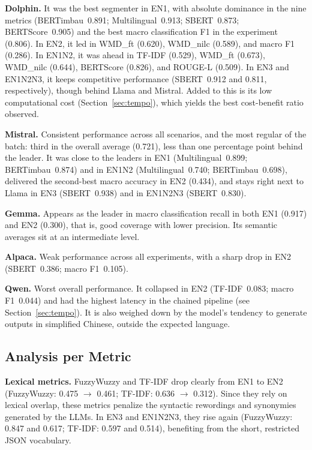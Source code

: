 \documentclass[a4paper,fleqn]{cas-sc}
\begin{document}
\textbf{Dolphin.} It was the best segmenter in EN1, with absolute dominance in the nine metrics (BERTimbau~0.891; Multilingual~0.913; SBERT~0.873; BERTScore~0.905) and the best macro classification F1 in the experiment (0.806). In EN2, it led in WMD\_ft (0.620), WMD\_nilc (0.589), and macro F1 (0.286). In EN1N2, it was ahead in TF-IDF (0.529), WMD\_ft (0.673), WMD\_nilc (0.644), BERTScore (0.826), and ROUGE-L (0.509). In EN3 and EN1N2N3, it keeps competitive performance (SBERT~0.912 and 0.811, respectively), though behind Llama and Mistral. Added to this is its low computational cost (Section~\ref{sec:tempo}), which yields the best cost-benefit ratio observed.

\textbf{Mistral.} Consistent performance across all scenarios, and the most regular of the batch: third in the overall average (0.721), less than one percentage point behind the leader. It was close to the leaders in EN1 (Multilingual~0.899; BERTimbau~0.874) and in EN1N2 (Multilingual~0.740; BERTimbau~0.698), delivered the second-best macro accuracy in EN2 (0.434), and stays right next to Llama in EN3 (SBERT~0.938) and in EN1N2N3 (SBERT~0.830).

\textbf{Gemma.} Appears as the leader in macro classification recall in both EN1 (0.917) and EN2 (0.300), that is, good coverage with lower precision. Its semantic averages sit at an intermediate level.

\textbf{Alpaca.} Weak performance across all experiments, with a sharp drop in EN2 (SBERT~0.386; macro F1~0.105).

\textbf{Qwen.} Worst overall performance. It collapsed in EN2 (TF-IDF~0.083; macro F1~0.044) and had the highest latency in the chained pipeline (see Section~\ref{sec:tempo}). It is also weighed down by the model's tendency to generate outputs in simplified Chinese, outside the expected language.

\subsection{Analysis per Metric}

\textbf{Lexical metrics.} FuzzyWuzzy and TF-IDF drop clearly from EN1 to EN2 (FuzzyWuzzy: 0.475 $\rightarrow$ 0.461; TF-IDF: 0.636 $\rightarrow$ 0.312). Since they rely on lexical overlap, these metrics penalize the syntactic rewordings and synonymies generated by the LLMs. In EN3 and EN1N2N3, they rise again (FuzzyWuzzy: 0.847 and 0.617; TF-IDF: 0.597 and 0.514), benefiting from the short, restricted JSON vocabulary.
\end{document}
